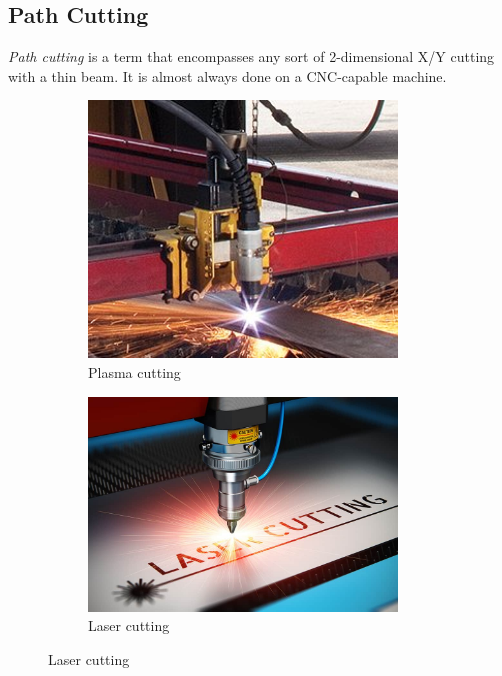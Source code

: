 \documentclass[10pt,letterpaper]{book}
\begin{document}
 
 \subsection{Path Cutting}
 
 \textit{Path cutting} is a term that encompasses any sort of 2-dimensional X/Y cutting with a thin beam. It is almost always done on a CNC-capable machine.
 
 \begin{figure}[H]
		\begin{subfigure}[b]{.24\linewidth}
			\includegraphics[width=0.9\textwidth]{imgs/plasmacut.jpeg}
			\caption{Plasma cutting}
		\end{subfigure}\begin{subfigure}[b]{.24\linewidth}
			\includegraphics[width=0.9\textwidth]{imgs/lasercut.jpeg}
			\caption{Laser cutting}

\end{subfigure}
\end{figure}
\end{document}
